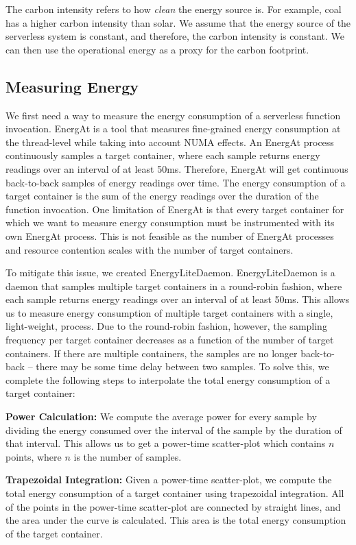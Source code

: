 \documentclass[times, 10pt,twocolumn]{article}
\begin{document}
The carbon intensity refers to how \textit{clean} the energy source is. For example, coal has a higher carbon intensity than solar. We assume that the energy source of the serverless system is constant, and therefore, the carbon intensity is constant. We can then use the operational energy as a proxy for the carbon footprint.

\subsection{Measuring Energy}
We first need a way to measure the energy consumption of a serverless function invocation. EnergAt \cite{he2023hotcarbon} is a tool that measures fine-grained energy consumption at the thread-level while taking into account NUMA effects. An EnergAt process continuously samples a target container, where each sample returns energy readings over an interval of at least 50ms. Therefore, EnergAt will get continuous back-to-back samples of energy readings over time. The energy consumption of a target container is the sum of the energy readings over the duration of the function invocation. One limitation of EnergAt is that every target container for which we want to measure energy consumption must be instrumented with its own EnergAt process. This is not feasible as the number of EnergAt processes and resource contention scales with the number of target containers.

To mitigate this issue, we created EnergyLiteDaemon. EnergyLiteDaemon is a daemon that samples multiple target containers in a round-robin fashion, where each sample returns energy readings over an interval of at least 50ms. This allows us to measure energy consumption of multiple target containers with a single, light-weight, process. Due to the round-robin fashion, however, the sampling frequency per target container decreases as a function of the number of target containers. If there are multiple containers, the samples are no longer back-to-back -- there may be some time delay between two samples. To solve this, we complete the following steps to interpolate the total energy consumption of a target container:

\textbf{Power Calculation:} We compute the average power for every sample by dividing the energy consumed over the interval of the sample by the duration of that interval. This allows us to get a power-time scatter-plot which contains $n$ points, where $n$ is the number of samples.

\textbf{Trapezoidal Integration:} Given a power-time scatter-plot, we compute the total energy consumption of a target container using trapezoidal integration. All of the points in the power-time scatter-plot are connected by straight lines, and the area under the curve is calculated. This area is the total energy consumption of the target container. 
\end{document}
